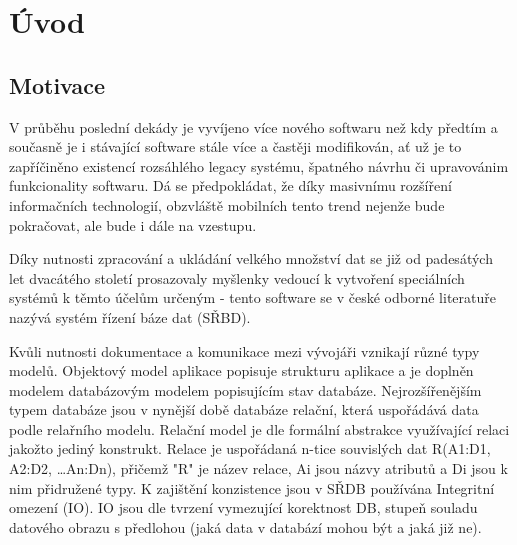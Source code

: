 \documentclass[11pt,twoside,a4paper]{book}
\begin{document}
\listoftables



\mainbodystarts


% 
% 

\chapter{Úvod}
\section{Motivace}

V průběhu poslední dekády je vyvíjeno více nového softwaru než kdy předtím a
současně je i stávající software stále více a častěji modifikován, ať už
je to zapříčiněno  existencí rozsáhlého legacy systému, špatného návrhu či
upravovánim funkcionality softwaru. Dá se předpokládat, že díky masivnímu
rozšíření informačních technologií, obzvláště mobilních tento trend nejenže bude
pokračovat, ale bude i dále na vzestupu.

Díky nutnosti zpracování a ukládání velkého množství dat se již od padesátých
let dvacátého století prosazovaly myšlenky vedoucí k vytvoření speciálních
systémů k těmto účelům určeným - tento software se v české odborné literatuře
nazývá systém řízení báze dat (SŘBD). 

Kvůli nutnosti dokumentace a komunikace mezi vývojáři vznikají různé typy
modelů. Objektový model aplikace popisuje strukturu aplikace a je doplněn 
modelem databázovým modelem popisujícím stav databáze. Nejrozšířenějším typem
databáze jsou v nynější době databáze relační, která uspořádává data podle
relařního modelu. Relační model je dle \cite{DBS_02} formální abstrakce
využívající relaci jakožto jediný konstrukt. Relace je uspořádaná n-tice
souvislých dat R(A1:D1, A2:D2, \ldots An:Dn), přičemž "R" je název relace, Ai
jsou názvy atributů a Di jsou k nim přidružené typy. K zajištění konzistence
jsou v SŘDB používána Integritní omezení (IO). IO jsou dle \cite{DBS2_02} tvrzení
vymezující korektnost DB, stupeň souladu datového obrazu s předlohou (jaká data
v databází mohou být a jaká již ne).
\end{document}
